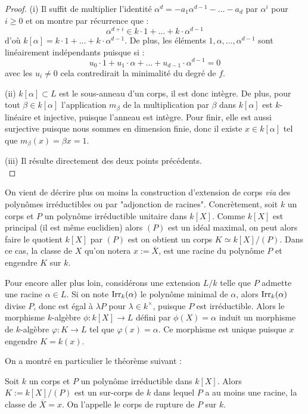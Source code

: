 \documentclass[a4paper]{article} %
\numberwithin{section}{part}
\numberwithin{equation}{section}
\newcommand\Irr[2]{\textup{Irr}_{#1}(#2)}
\begin{document}
\begin{proof}
(i) Il suffit de multiplier l'identité $\alpha^d = -a_1\alpha^{d-1} - \dots 
- a_d$ par $\alpha^i$ pour $i\geq0$ et on montre par récurrence que :
\[\alpha^{d+i} \in k\cdot1 + \dots + k\cdot\alpha^{d-1}\]
d'où $k[\alpha] = k\cdot1 + \dots + k\cdot\alpha^{d-1}$. De plus, les éléments 
$1,\alpha,\dots,\alpha^{d-1}$ sont linéairement indépendants puisque si :
\[u_0\cdot1 + u_1\cdot\alpha + \dots + u_{d-1}\cdot\alpha^{d-1} = 0\]
avec les $u_i\neq0$ cela contredirait la minimalité du degré de $f$.\par
(ii) $k[\alpha] \subset L$ est le sous-anneau d'un corps, il est donc intègre. 
De plus, pour tout $\beta\in k[\alpha]$ l'application $m_{\beta}$ de la 
multiplication par $\beta$ dans $k[\alpha]$ est $k$-linéaire et injective, 
puisque l'anneau est intègre. Pour finir, elle est aussi surjective puisque 
nous sommes en dimension finie, donc il existe $x\in k[\alpha]$ tel que 
$m_{\beta}(x) = \beta x = 1$.\par
(iii) Il résulte directement des deux points précédents.\\
\end{proof}

On vient de décrire plus ou moins la construction d'extension de corps 
\textit{via} des polynômes irréductibles ou par "adjonction de racines". 
Concrètement, soit $k$ un corps et $P$ un polynôme irréductible unitaire 
dans $k[X]$. Comme $k[X]$ est principal (il est même euclidien) alors $(P)$ est 
un idéal maximal, on peut alors faire le quotient $k[X]$ par $(P)$ est on 
obtient un corps $K \simeq k[X]/(P)$. Dans ce cas, la classe de $X$ qu'on notera
$x := \overline{X}$, est une racine du polynôme $P$ et engendre $K$ sur $k$.\par
Pour encore aller plus loin, considérons une extension $L/k$ telle que $P$ 
admette une racine $\alpha\in L$. Si on note $\Irr{k}{\alpha}$ le polynôme 
minimal de $\alpha$, alors $\Irr{k}{\alpha}$ divise $P$, donc est égal à 
$\lambda P$ pour $\lambda\in k^{\times}$, puisque $P$ est irréductible. Alors 
le morphisme $k$-algèbre $\phi : k[X] \to L$ défini par $\phi(X) = \alpha$ 
induit un morphisme de $k$-algèbre $\varphi : K \to L$ tel que $\varphi(x) 
= \alpha$. Ce morphisme est unique puisque $x$ engendre $K = k(x)$.\par
\vspace{0.3cm}
On a montré en particulier le théorème suivant :

\begin{thm}
Soit $k$ un corps et $P$ un polynôme irréductible dans $k[X]$. Alors $K := 
k[X]/(P)$ est un sur-corps de $k$ dans lequel $P$ a au moins une racine, la 
classe de $\overline{X} = x$. On l'appelle le corps de rupture de $P$ sur 
$k$.\par
\end{thm}
\end{document}
